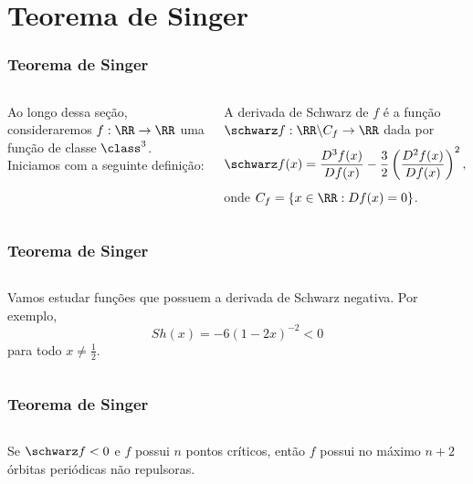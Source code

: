 \section{Teorema de Singer}


\begin{frame}
\vspace{5pt}
\frametitle{Teorema de Singer}
\begin{columns}
\column{\dimexpr\paperwidth-15pt}

Ao longo dessa seção, consideraremos $f: \RR \to \RR$ uma função de classe $\class^3$. Iniciamos com a seguinte definição: 

\begin{definition}
A derivada de Schwarz de $f$ é a função $\schwarz f: \RR \backslash C_f \to \RR$ dada por
$$\schwarz f(x) = \frac{D^3 f(x)}{D f(x)} - \frac{3}{2} \left( \frac{D^2 f(x)}{D f(x)} \right)^2,$$
onde $C_f = \lbrace x \in \RR: Df(x) = 0 \rbrace$.
\end{definition}

\end{columns}
\end{frame}


\begin{frame}
\vspace{5pt}
\frametitle{Teorema de Singer}
\begin{columns}
\column{\dimexpr\paperwidth-15pt}

Vamos estudar funções que possuem a derivada de Schwarz negativa. Por exemplo,
$$Sh(x) = -6(1 - 2x)^{-2} < 0$$
para todo $x \neq \frac{1}{2}$.

\end{columns}
\end{frame}


\begin{frame}
\vspace{5pt}
\frametitle{Teorema de Singer}
\begin{columns}
\column{\dimexpr\paperwidth-15pt}

\begin{theorem}[Singer]
Se $\schwarz f < 0$ e $f$ possui $n$ pontos críticos, então $f$ possui no máximo $n+2$ órbitas periódicas não repulsoras.
\end{theorem}

\end{columns}
\end{frame}
